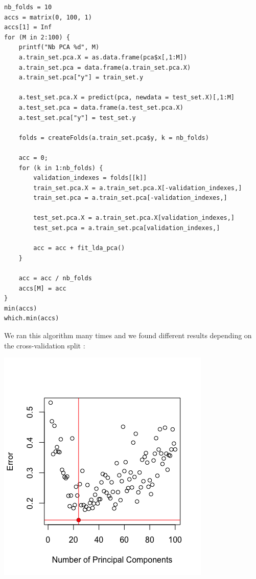 \documentclass[]{report}
\begin{document}
\begin{lstlisting}
nb_folds = 10
accs = matrix(0, 100, 1)
accs[1] = Inf
for (M in 2:100) {
	printf("Nb PCA %d", M)
	a.train_set.pca.X = as.data.frame(pca$x[,1:M])
	a.train_set.pca = data.frame(a.train_set.pca.X)
	a.train_set.pca["y"] = train_set.y
	
	a.test_set.pca.X = predict(pca, newdata = test_set.X)[,1:M]
	a.test_set.pca = data.frame(a.test_set.pca.X)
	a.test_set.pca["y"] = test_set.y
	
	folds = createFolds(a.train_set.pca$y, k = nb_folds)
	
	acc = 0;
	for (k in 1:nb_folds) {
		validation_indexes = folds[[k]]
		train_set.pca.X = a.train_set.pca.X[-validation_indexes,]
		train_set.pca = a.train_set.pca[-validation_indexes,]
		
		test_set.pca.X = a.train_set.pca.X[validation_indexes,]
		test_set.pca = a.train_set.pca[validation_indexes,]
		
		acc = acc + fit_lda_pca()
	}
	
	acc = acc / nb_folds
	accs[M] = acc
}
min(accs)
which.min(accs)
\end{lstlisting}

We ran this algorithm many times and we found different results depending on the cross-validation split : 

\begin{center}
	\includegraphics[width=0.6\linewidth]{Figures/lda_pca_cv.png}
	\label{fig:lda_pca_cv}
\end{center}
\end{document}
